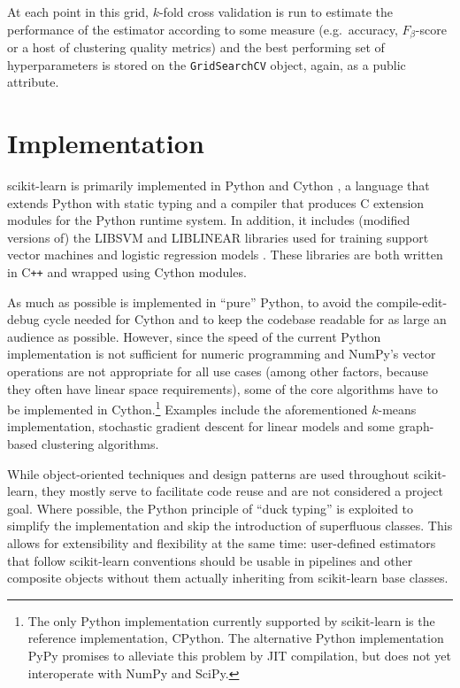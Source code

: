 \documentclass{llncs}
\begin{document}
At each point in this grid, $k$-fold cross validation is run
to estimate the performance of the estimator according to some measure
(e.g.\ accuracy, $F_\beta$-score or a host of clustering quality metrics)
and the best performing set of hyperparameters is stored
on the \texttt{GridSearchCV} object, again, as a public attribute.

\section{Implementation}

scikit-learn is primarily implemented in Python and Cython
\citep{behnel2011cython},
a language that extends Python with static typing
and a compiler that produces C extension modules
for the Python runtime system.
In addition, it includes (modified versions of)
the \textsf{LIBSVM} and \textsf{LIBLINEAR} libraries
used for training support vector machines
and logistic regression models \citep{chang2011libsvm, fan2008}.
These libraries are both written in C{}\verb!++!
and wrapped using Cython modules.

As much as possible is implemented in ``pure'' Python,
to avoid the compile-edit-debug cycle needed for Cython
and to keep the codebase readable for as large an audience as possible.
However, since the speed of the current Python implementation
is not sufficient for numeric programming
and NumPy's vector operations are not appropriate for all use cases
(among other factors, because they often have linear space requirements),
some of the core algorithms have to be implemented in Cython.\footnote{
  The only Python implementation currently supported by scikit-learn
  is the reference implementation, CPython.
  The alternative Python implementation PyPy \citep{bolz2009tracing}
  promises to alleviate this problem by JIT compilation,
  but does not yet interoperate with NumPy and SciPy.
}
Examples include the aforementioned $k$-means implementation,
stochastic gradient descent for linear models
and some graph-based clustering algorithms.

While object-oriented techniques and design patterns
are used throughout scikit-learn,
they mostly serve to facilitate code reuse and are not considered a project goal.
Where possible, the Python principle of ``duck typing'' is exploited
to simplify the implementation and skip the introduction of superfluous classes.
This allows for extensibility and flexibility at the same time:
user-defined estimators that follow scikit-learn conventions
should be usable in pipelines and other composite objects
without them actually inheriting from scikit-learn base classes.
\end{document}
